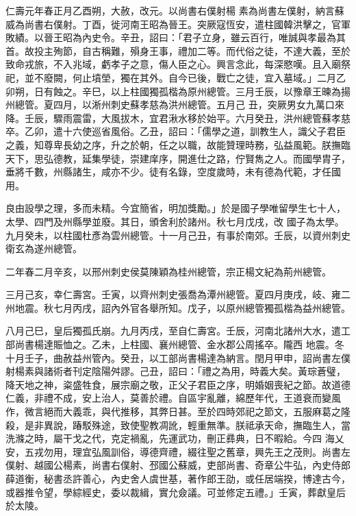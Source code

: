 \begin{pinyinscope}
 仁壽元年春正月乙酉朔，大赦，改元。以尚書右僕射楊
 素為尚書左僕射，納言蘇威為尚書右僕射。丁酉，徙河南王昭為晉王。突厥寇恆安，遣柱國韓洪擊之，官軍敗績。以晉王昭為內史令。辛丑，詔曰：「君子立身，雖云百行，唯誠與孝最為其首。故投主殉節，自古稱難，殞身王事，禮加二等。而代俗之徒，不達大義，至於致命戎旅，不入兆域，虧孝子之意，傷人臣之心。興言念此，每深愍嘆。且入廟祭祀，並不廢闕，何止墳塋，獨在其外。自今已後，戰亡之徒，宜入墓域。」二月乙卯朔，日有蝕之。辛巳，以上柱國獨孤楷為原州總管。三月壬辰，以豫章王暕為揚州總管。夏四月，以淅州刺史蘇孝慈為洪州總管。五月己
 丑，突厥男女九萬口來降。壬辰，驟雨震雷，大風拔木，宜君湫水移於始平。六月癸丑，洪州總管蘇孝慈卒。乙卯，遣十六使巡省風俗。乙丑，詔曰：「儒學之道，訓教生人，識父子君臣之義，知尊卑長幼之序，升之於朝，任之以職，故能贊理時務，弘益風範。朕撫臨天下，思弘德教，延集學徒，崇建庠序，開進仕之路，佇賢雋之人。而國學胄子，垂將千數，州縣諸生，咸亦不少。徒有名錄，空度歲時，未有德為代範，才任國用。



 良由設學之理，多而未精。今宜簡省，明加獎勵。」於是國子學唯留學生七十人，太學、四門及州縣學並廢。其日，頒舍利於諸州。秋七月戊戌，改
 國子為太學。九月癸未，以柱國杜彥為雲州總管。十一月己丑，有事於南郊。壬辰，以資州刺史衛玄為遂州總管。



 二年春二月辛亥，以邢州刺史侯莫陳穎為桂州總管，宗正楊文紀為荊州總管。



 三月己亥，幸仁壽宮。壬寅，以齊州刺史張喬為潭州總管。夏四月庚戌，岐、雍二州地震。秋七月丙戌，詔內外官各舉所知。戊子，以原州總管獨孤楷為益州總管。



 八月己巳，皇后獨孤氏崩。九月丙戌，至自仁壽宮。壬辰，河南北諸州大水，遣工部尚書楊達賑恤之。乙未，上柱國、襄州總管、金水郡公周搖卒。隴西
 地震。冬十月壬子，曲赦益州管內。癸丑，以工部尚書楊達為納言。閏月甲申，詔尚書左僕射楊素與諸術者刊定陰陽舛謬。己丑，詔曰：「禮之為用，時義大矣。黃琮蒼璧，降天地之神，粢盛牲食，展宗廟之敬，正父子君臣之序，明婚姻喪紀之節。故道德仁義，非禮不成，安上治人，莫善於禮。自區宇亂離，綿歷年代，王道衰而變風作，微言絕而大義乖，與代推移，其弊日甚。至於四時郊祀之節文，五服麻葛之隆殺，是非異說，踳駁殊途，致使聖教凋訛，輕重無準。朕祗承天命，撫臨生人，當洗滌之時，屬干戈之代，克定禍亂，先運武功，刪正彞典，日不暇給。今四
 海乂安，五戎勿用，理宜弘風訓俗，導德齊禮，綴往聖之舊章，興先王之茂則。尚書左僕射、越國公楊素，尚書右僕射、邳國公蘇威，吏部尚書、奇章公牛弘，內史侍郎薛道衡，秘書丞許善心，內史舍人虞世基，著作郎王劭，或任居端揆，博達古今，或器推令望，學綜經史，委以裁緝，實允僉議。可並修定五禮。」壬寅，葬獻皇后於太陵。




\end{pinyinscope}
